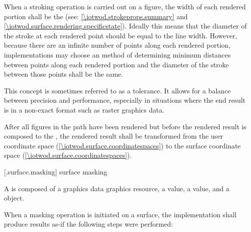 \pnum
When a stroking operation is carried out on a figure, the width of each rendered portion shall be the  (see: \ref{\iotwod.strokeprops.summary} and \ref{\iotwod.surface.rendering.specificstate}). Ideally this means that the diameter of the stroke at each rendered point should be equal to the line width. However, because there are an infinite number of points along each rendered portion, implementations may choose an \unspecnorm method of determining minimum distances between points along each rendered portion and the diameter of the stroke between those points shall be the same.
\begin{note}
This concept is sometimes referred to as a tolerance. It allows for a balance between precision and performance, especially in situations where the end result is in a non-exact format such as raster graphics data.
\end{note}

\pnum
After all figures in the path have been rendered but before the rendered result is composed to the \underlyingsurface, the rendered result shall be transformed from the user coordinate space (\ref{\iotwod.surface.coordinatespaces}) to the surface coordinate space (\ref{\iotwod.surface.coordinatespaces}).

 [\iotwod.surface.masking] {surface masking}

\pnum
A  is composed of a graphics data graphics resource, a  value, a  value, and a  object.

\pnum
When a masking operation is initiated on a surface, the implementation shall produce results as-if the following steps were performed:

